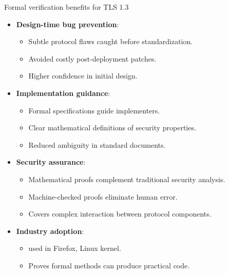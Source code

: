 \documentclass[aspectratio=169, lualatex, handout]{beamer}
\begin{document}
\begin{frame}{Formal verification benefits for TLS 1.3}
	\begin{itemize}
		\item \textbf{Design-time bug prevention}:
		      \begin{itemize}
			      \item Subtle protocol flaws caught before standardization.
			      \item Avoided costly post-deployment patches.
			      \item Higher confidence in initial design.
		      \end{itemize}
		\item \textbf{Implementation guidance}:
		      \begin{itemize}
			      \item Formal specifications guide implementers.
			      \item Clear mathematical definitions of security properties.
			      \item Reduced ambiguity in standard documents.
		      \end{itemize}
		\item \textbf{Security assurance}:
		      \begin{itemize}
			      \item Mathematical proofs complement traditional security analysis.
			      \item Machine-checked proofs eliminate human error.
			      \item Covers complex interaction between protocol components.
		      \end{itemize}
		\item \textbf{Industry adoption}:
		      \begin{itemize}
			      \item \haclstar used in Firefox, Linux kernel.
			      \item Proves formal methods can produce practical code.
		      \end{itemize}
	\end{itemize}
\end{frame}
\end{document}
